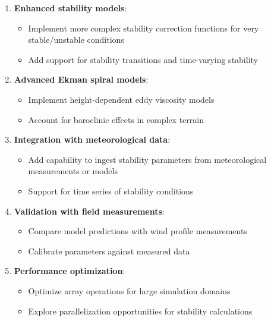 \documentclass[
]{article}
\providecommand{\tightlist}{%
  \setlength{\itemsep}{0pt}\setlength{\parskip}{0pt}}
\begin{document}
\begin{enumerate}
\def\labelenumi{\arabic{enumi}.}
\tightlist
\item
  \textbf{Enhanced stability models}:

  \begin{itemize}
  \tightlist
  \item
    Implement more complex stability correction functions for very
    stable/unstable conditions
  \item
    Add support for stability transitions and time-varying stability
  \end{itemize}
\item
  \textbf{Advanced Ekman spiral models}:

  \begin{itemize}
  \tightlist
  \item
    Implement height-dependent eddy viscosity models
  \item
    Account for baroclinic effects in complex terrain
  \end{itemize}
\item
  \textbf{Integration with meteorological data}:

  \begin{itemize}
  \tightlist
  \item
    Add capability to ingest stability parameters from meteorological
    measurements or models
  \item
    Support for time series of stability conditions
  \end{itemize}
\item
  \textbf{Validation with field measurements}:

  \begin{itemize}
  \tightlist
  \item
    Compare model predictions with wind profile measurements
  \item
    Calibrate parameters against measured data
  \end{itemize}
\item
  \textbf{Performance optimization}:

  \begin{itemize}
  \tightlist
  \item
    Optimize array operations for large simulation domains
  \item
    Explore parallelization opportunities for stability calculations
  \end{itemize}
\end{enumerate}
\end{document}

